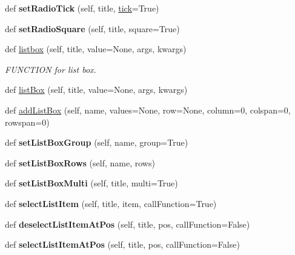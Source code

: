 \begin{DoxyCompactItemize}
def {\bfseries set\+Radio\+Tick} (self, title, \hyperlink{classappjar_1_1gui_ab98fbb5e6c2e23f49a2b6d02927fb347}{tick}=True)
\item 
\mbox{\label{classappjar_1_1gui_a7e057579288943bd60737b15c4a2583e}} 
def {\bfseries set\+Radio\+Square} (self, title, square=True)
\item 
def \hyperlink{classappjar_1_1gui_a5e171d29e2588295ba6fd151c091ab70}{listbox} (self, title, value=None, args, kwargs)
\begin{DoxyCompactList}\small\item\em F\+U\+N\+C\+T\+I\+ON for list box. \end{DoxyCompactList}\item 
def \hyperlink{classappjar_1_1gui_a22acd279d0497dafc7c0e0619ccc4d89}{list\+Box} (self, title, value=None, args, kwargs)
\item 
def \hyperlink{classappjar_1_1gui_a94fe73471588d0cde12bc20fdb1093a5}{add\+List\+Box} (self, name, values=None, row=None, column=0, colspan=0, rowspan=0)
\item 
\mbox{\label{classappjar_1_1gui_a1bf3e8cf29222006a5e288835180e9e2}} 
def {\bfseries set\+List\+Box\+Group} (self, name, group=True)
\item 
\mbox{\label{classappjar_1_1gui_ad8a85364e80f2d811b1b435dae2eb994}} 
def {\bfseries set\+List\+Box\+Rows} (self, name, rows)
\item 
\mbox{\label{classappjar_1_1gui_ad74cc409b4fe0f86cadb95df84e3e7c5}} 
def {\bfseries set\+List\+Box\+Multi} (self, title, multi=True)
\item 
\mbox{\label{classappjar_1_1gui_a9956aef80274706bc7c03b395f8f2495}} 
def {\bfseries select\+List\+Item} (self, title, item, call\+Function=True)
\item 
\mbox{\label{classappjar_1_1gui_a78192724e4e0c0d27e6020c875bb0a86}} 
def {\bfseries deselect\+List\+Item\+At\+Pos} (self, title, pos, call\+Function=False)
\item 
\mbox{\label{classappjar_1_1gui_a4f24bf3600063033168c17f772669e82}} 
def {\bfseries select\+List\+Item\+At\+Pos} (self, title, pos, call\+Function=False)

\end{DoxyCompactItemize}
